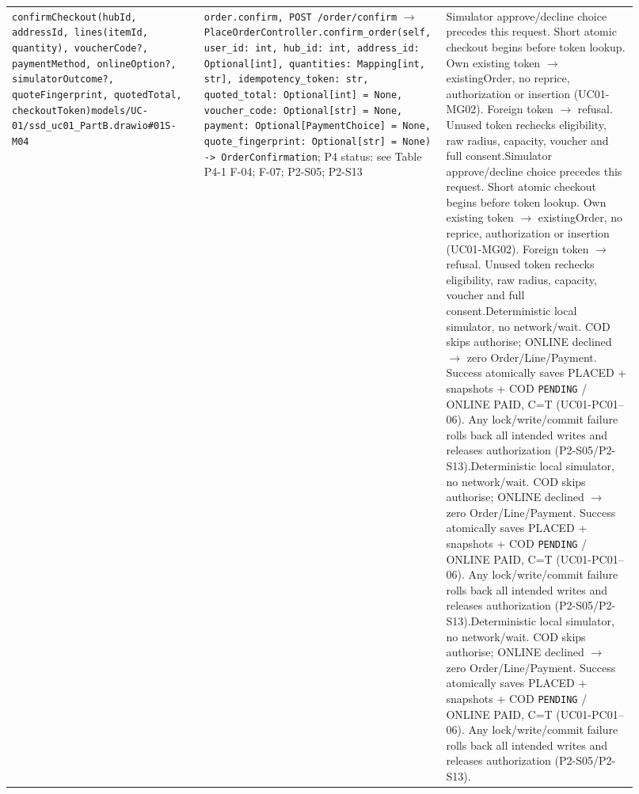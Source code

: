 \begin{longtable}{>{\raggedright\arraybackslash}p{0.3067\linewidth}>{\raggedright\arraybackslash}p{0.3067\linewidth}>{\raggedright\arraybackslash}p{0.3067\linewidth}}
\texttt{confirmCheckout(hubId, addressId, lines(itemId, quantity), voucherCode?, paymentMethod, onlineOption?, simulatorOutcome?, quoteFingerprint, quotedTotal, checkoutToken)}\newline{}\texttt{models/\allowbreak{}UC-01/\allowbreak{}ssd\_\allowbreak{}uc01\_\allowbreak{}PartB.\allowbreak{}drawio\#01S-M04} & \texttt{order.\allowbreak{}confirm, POST /\allowbreak{}order/\allowbreak{}confirm} \ensuremath{\rightarrow} \texttt{PlaceOrderController.\allowbreak{}confirm\_\allowbreak{}order(self, user\_\allowbreak{}id: int, hub\_\allowbreak{}id: int, address\_\allowbreak{}id: Optional[int], quantities: Mapping[int, str], idempotency\_\allowbreak{}token: str, quoted\_\allowbreak{}total: Optional[int] = None, voucher\_\allowbreak{}code: Optional[str] = None, payment: Optional[PaymentChoice] = None, quote\_\allowbreak{}fingerprint: Optional[str] = None) -\textgreater{} OrderConfirmation}; P4 status: see Table P4-1 F-04; F-07; P2-S05; P2-S13 & Simulator approve/decline choice precedes this request. Short atomic checkout begins before token lookup. Own existing token \ensuremath{\rightarrow} existingOrder, no reprice, authorization or insertion (UC01-MG02). Foreign token \ensuremath{\rightarrow} refusal. Unused token rechecks eligibility, raw radius, capacity, voucher and full consent.\newline{}Simulator approve/decline choice precedes this request. Short atomic checkout begins before token lookup. Own existing token \ensuremath{\rightarrow} existingOrder, no reprice, authorization or insertion (UC01-MG02). Foreign token \ensuremath{\rightarrow} refusal. Unused token rechecks eligibility, raw radius, capacity, voucher and full consent.\newline{}Deterministic local simulator, no network/wait. COD skips authorise; ONLINE declined \ensuremath{\rightarrow} zero Order/Line/Payment. Success atomically saves PLACED + snapshots + COD \texttt{PENDING} / ONLINE PAID, C=T (UC01-PC01--06). Any lock/write/commit failure rolls back all intended writes and releases authorization (P2-S05/P2-S13).\newline{}Deterministic local simulator, no network/wait. COD skips authorise; ONLINE declined \ensuremath{\rightarrow} zero Order/Line/Payment. Success atomically saves PLACED + snapshots + COD \texttt{PENDING} / ONLINE PAID, C=T (UC01-PC01--06). Any lock/write/commit failure rolls back all intended writes and releases authorization (P2-S05/P2-S13).\newline{}Deterministic local simulator, no network/wait. COD skips authorise; ONLINE declined \ensuremath{\rightarrow} zero Order/Line/Payment. Success atomically saves PLACED + snapshots + COD \texttt{PENDING} / ONLINE PAID, C=T (UC01-PC01--06). Any lock/write/commit failure rolls back all intended writes and releases authorization (P2-S05/P2-S13). \\

\end{longtable}
